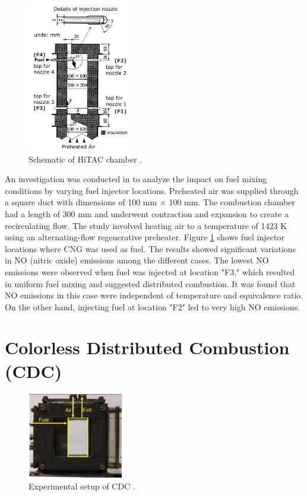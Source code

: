 \begin{figure}
    \centering
    \includegraphics[width=0.4\textwidth]{Chapter2/Images/HiTAC.png}
    \caption[Schematic of HiTAC chamber]{Schematic of HiTAC chamber \cite{CHOI1998}.}
    \label{fig:HiTAC}
\end{figure}

An investigation was conducted in \cite{CHOI1998} to analyze the impact on fuel mixing conditions by varying fuel injector locations. Preheated air was supplied through a square duct with dimensions of 100 mm $\times$ 100 mm. The combustion chamber had a length of 300 mm and underwent contraction and expansion to create a recirculating flow. The study involved heating air to a temperature of 1423 K using an alternating-flow regenerative preheater. Figure \ref{fig:HiTAC} shows fuel injector locations where CNG was used as fuel. The results showed significant variations in NO (nitric oxide) emissions among the different cases. The lowest NO emissions were observed when fuel was injected at location "F3," which resulted in uniform fuel mixing and suggested distributed combustion. It was found that NO emissions in this case were independent of temperature and equivalence ratio. On the other hand, injecting fuel at location "F2" led to very high NO emissions.

\section{Colorless Distributed Combustion (CDC)}
 \begin{figure}
     \centering
     \includegraphics[width=0.37\textwidth]{Chapter2/Images/CDC.png}
     \caption[Experimental setup of CDC]{Experimental setup of CDC \cite{ARGHODE2012822}.}
     \label{fig:CDC}
 \end{figure}
 
